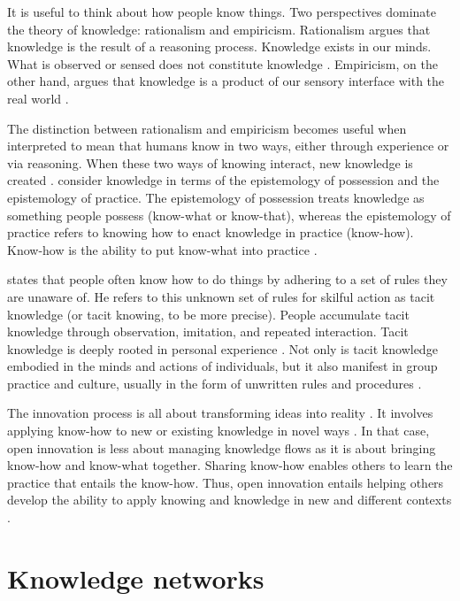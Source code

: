 It is useful to think about how people know things. Two perspectives dominate the theory of knowledge: rationalism and empiricism. Rationalism argues that knowledge is the result of a reasoning process. Knowledge exists in our minds. What is observed or sensed does not constitute knowledge \citep{russell2009human}. Empiricism, on the other hand, argues that knowledge is a product of our sensory interface with the real world \citep{bolisani2018elusive}. \medskip

The distinction between rationalism and empiricism becomes useful when interpreted to mean that humans know in two ways, either through experience or via reasoning. When these two ways of knowing interact, new knowledge is created \citep{spender1996making,bolisani2018elusive}. \citet{cook1999bridging} consider knowledge in terms of the epistemology of possession and the epistemology of practice. The epistemology of possession treats knowledge as something people possess (know-what or know-that), whereas the epistemology of practice refers to knowing how to enact knowledge in practice (know-how). Know-how is the ability to put know-what into practice \citep{cook1999bridging,tsoukas2001organizational}. \medskip

\citet{polanyi1966tacit} states that people often know how to do things by adhering to a set of rules they are unaware of. He refers to this unknown set of rules for skilful action as tacit knowledge (or tacit knowing, to be more precise). People accumulate tacit knowledge through observation, imitation, and repeated interaction. Tacit knowledge is deeply rooted in personal experience \citep{nonaka1995knowledge}. Not only is tacit knowledge embodied in the minds and actions of individuals, but it also manifest in group practice and culture, usually in the form of unwritten rules and procedures \citep{munoz2015tacit}. \medskip

The innovation process is all about transforming ideas into reality \citep{garud2013perspectives}. It involves applying know-how to new or existing knowledge in novel ways \citep{van1986central,quintane2011innovation}. In that case, open innovation is less about managing knowledge flows as it is about bringing know-how and know-what together. Sharing know-how enables others to learn the practice that entails the know-how. Thus, open innovation entails helping others develop the ability to apply knowing and knowledge in new and different contexts \citep{van1986central}. 

\section{Knowledge networks}

